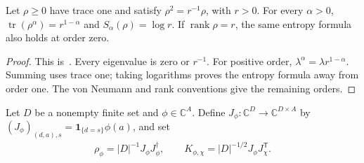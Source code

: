 \begin{lemma}%
    \label{thm:peps_flat_density_renyi_entropy}
    \leanok
    Let $\rho\geq0$ have trace one and satisfy $\rho^2=r^{-1}\rho$, with
    $r>0$. For every $\alpha>0$,
    $\operatorname{tr}(\rho^\alpha)=r^{1-\alpha}$ and
    $S_\alpha(\rho)=\log r$. If $\operatorname{rank}\rho=r$, the same
    entropy formula also holds at order zero.
\end{lemma}
\begin{proof}\leanok
    This is~\cite[``All finite R\'enyi orders of a flat
        density'']{QICLean2026Blueprint}.
    Every eigenvalue is zero or $r^{-1}$. For positive order,
    $\lambda^\alpha=\lambda r^{1-\alpha}$. Summing uses trace one;
    taking logarithms proves the entropy formula away from order one.
    The von Neumann and rank conventions give the remaining orders.
\end{proof}

\begin{definition}%
    \label{def:peps_fixed_boundary_factor_density}
    \leanok
    Let $D$ be a nonempty finite set and $\phi\in\mathbb C^A$.
    Define $J_\phi:\mathbb C^D\to\mathbb C^{D\times A}$ by
    $(J_\phi)_{(d,a),s}=\mathbf 1_{\{d=s\}}\phi(a)$, and set
    \begin{align}
        \rho_\phi=|D|^{-1}J_\phi J_\phi^\dagger,
        \qquad K_{\phi,\chi}=|D|^{-1/2}J_\phi J_\chi^{\mathsf T}.
    \end{align}
\end{definition}

